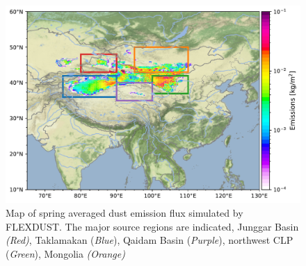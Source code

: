 \begin{figure}[hptb]
    \centering
    \includegraphics[width=\textwidth]{texfiles/figs/emission_map_1999_2019.pdf}
    \caption{Map of spring averaged dust emission flux simulated by FLEXDUST. The major source regions are indicated,  Junggar Basin \emph{(Red)},  Taklamakan (\emph{Blue}),  Qaidam Basin (\emph{Purple}), northwest CLP (\emph{Green}),  Mongolia \emph{(Orange)}}
    \label{fig:emission_map_flexdust}
\end{figure}

